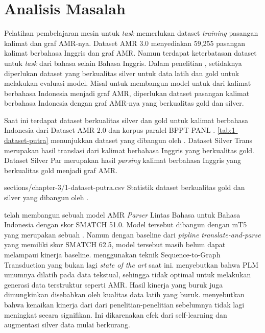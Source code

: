 \section{Analisis Masalah}

Pelatihan pembelajaran mesin untuk \textit{task} \amrparsing{} memerlukan dataset \textit{training} pasangan kalimat dan graf \gls{AMR}-nya.
Dataset AMR 3.0 menyediakan 59,255 pasangan kalimat berbahasa Inggris dan graf \gls{AMR}.
Namun terdapat keterbatasan dataset untuk \textit{task} \amrparsing{} dari bahasa selain Bahasa Inggris.
Dalam penelitian \textcite{blloshmi2020}, setidaknya diperlukan dataset yang berkualitas silver untuk data latih dan gold untuk melakukan evaluasi model.
Misal untuk membangun model untuk \amrparsing{} dari kalimat berbahasa Indonesia menjadi graf \gls{AMR}, diperlukan dataset pasangan kalimat berbahasa Indonesia dengan graf \gls{AMR}-nya yang berkualitas gold dan silver.

Saat ini terdapat dataset berkualitas silver dan gold untuk kalimat berbahasa Indonesia dari Dataset AMR 2.0 dan korpus paralel BPPT-PANL .
\cref{tab:1-dataset-putra} menunjukkan dataset yang dibangun oleh \textcite{putra2022}.
Dataset Silver Trans merupakan hasil translasi dari kalimat berbahasa Inggris yang berkualitas gold.
Dataset Silver Par merupakan hasil \textit{parsing} kalimat berbahasa Inggris yang berkualitas gold menjadi graf \gls{AMR}.

  {sections/chapter-3/1-dataset-putra.csv}
  {Statistik dataset berkualitas gold dan silver yang dibangun oleh \textcite{putra2022}.}

\textcite{putra2022} telah membangun sebuah model \gls{AMR} \textit{Parser} Lintas Bahasa untuk Bahasa Indonesia dengan skor \gls{SMATCH} 51.0.
Model tersebut dibangun dengan \mwordem{} mT5 yang merupakan sebuah .
Namun dengan baseline dari \textit{pipline translate-and-parse} yang memiliki skor \gls{SMATCH} 62.5, model tersebut masih belum dapat melampaui kinerja baseline.
\textcite{putra2022} menggunakan teknik Sequence-to-Graph Transduction  yang bukan lagi \textit{state of the art} \amrparsing{} saat ini.
\textcite{bai2022} menyebutkan bahwa \gls{PLM} umumnya dilatih pada data tekstual, sehingga tidak optimal untuk melakukan generasi data terstruktur seperti \gls{AMR}.
Hasil kinerja yang buruk juga dimungkinkan disebabkan oleh kualitas data latih yang buruk.
\textcite{lee2022} menyebutkan bahwa kenaikan kinerja dari \amrparsing{} dari penelitian-penelitian sebelumnya tidak lagi meningkat secara signifikan.
Ini dikarenakan efek dari self-learning dan augmentasi silver data mulai berkurang.
